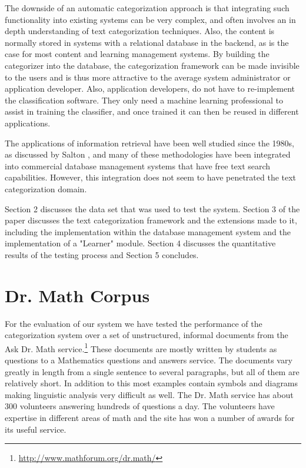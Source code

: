 \documentclass[twocolumn]{article}
\begin{document}
The downside of an automatic categorization approach is that integrating such 
functionality into existing systems can be very complex, and often involves an in 
depth understanding of text categorization techniques.  Also, the content is normally 
stored in systems with a relational database in the backend, as is the case for most 
content and learning management systems. By building the categorizer into the 
database, the categorization framework\cite{williams:02} can be made invisible to the 
users and is thus more attractive to the average system administrator or application 
developer. Also, application developers, do not have to re-implement the 
classification software. They only need a machine learning professional to assist in 
training the classifier, and once trained it can then be reused in different applications. 

The applications of information retrieval have been well studied since the 1980s, as 
discussed by Salton \cite{salton:89,salton:91}, and many of these methodologies have been 
integrated into commercial database management systems that have free text search 
capabilities. However, this integration does not seem to have penetrated the text 
categorization domain.

Section 2 discusses the data set that was used to test the system. Section 3 of the 
paper discusses the text categorization framework and the extensions made to it, 
including the implementation within the database management system and the 
implementation of a "Learner" module. Section 4 discusses the quantitative results of 
the testing process and Section 5 concludes.

\section{Dr. Math Corpus}

For the evaluation of our system we have tested the performance of the
categorization system over a set of unstructured, informal documents
from the Ask Dr. Math
service.\footnote{\url{http://www.mathforum.org/dr.math/}} These
documents are mostly written by students as questions to a Mathematics
questions and answers service.  The documents vary greatly in length
from a single sentence to several paragraphs,
but all of them are relatively short. In addition to this most examples contain symbols 
and diagrams making linguistic analysis very difficult as well. The Dr. Math service 
has about 300 volunteers answering hundreds of questions a day. The volunteers have 
expertise in different areas of math and the site has won a number of awards for its 
useful service. 
\end{document}
